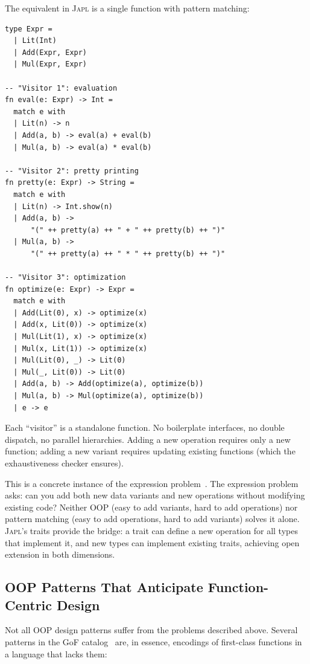 \documentclass[11pt,a4paper]{article}
\newcommand{\japl}{\textsc{Japl}}
\begin{document}
The equivalent in \japl{} is a single function with pattern matching:

\begin{lstlisting}
type Expr =
  | Lit(Int)
  | Add(Expr, Expr)
  | Mul(Expr, Expr)

-- "Visitor 1": evaluation
fn eval(e: Expr) -> Int =
  match e with
  | Lit(n) -> n
  | Add(a, b) -> eval(a) + eval(b)
  | Mul(a, b) -> eval(a) * eval(b)

-- "Visitor 2": pretty printing
fn pretty(e: Expr) -> String =
  match e with
  | Lit(n) -> Int.show(n)
  | Add(a, b) ->
      "(" ++ pretty(a) ++ " + " ++ pretty(b) ++ ")"
  | Mul(a, b) ->
      "(" ++ pretty(a) ++ " * " ++ pretty(b) ++ ")"

-- "Visitor 3": optimization
fn optimize(e: Expr) -> Expr =
  match e with
  | Add(Lit(0), x) -> optimize(x)
  | Add(x, Lit(0)) -> optimize(x)
  | Mul(Lit(1), x) -> optimize(x)
  | Mul(x, Lit(1)) -> optimize(x)
  | Mul(Lit(0), _) -> Lit(0)
  | Mul(_, Lit(0)) -> Lit(0)
  | Add(a, b) -> Add(optimize(a), optimize(b))
  | Mul(a, b) -> Mul(optimize(a), optimize(b))
  | e -> e
\end{lstlisting}

Each ``visitor'' is a standalone function. No boilerplate interfaces, no double dispatch, no parallel hierarchies. Adding a new operation requires only a new function; adding a new variant requires updating existing functions (which the exhaustiveness checker ensures).

This is a concrete instance of the expression problem~\citep{wadler1998expression}. The expression problem asks: can you add both new data variants and new operations without modifying existing code? Neither OOP (easy to add variants, hard to add operations) nor pattern matching (easy to add operations, hard to add variants) solves it alone. \japl{}'s traits provide the bridge: a trait can define a new operation for all types that implement it, and new types can implement existing traits, achieving open extension in both dimensions.

\subsection{OOP Patterns That Anticipate Function-Centric Design}

Not all OOP design patterns suffer from the problems described above. Several patterns in the GoF catalog~\citep{gamma1994design} are, in essence, encodings of first-class functions in a language that lacks them:
\end{document}
